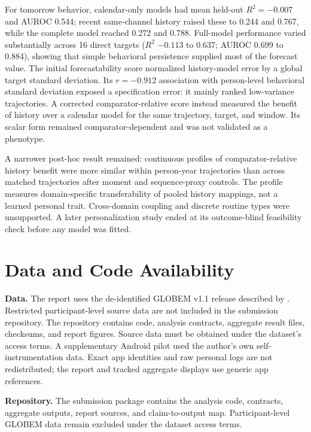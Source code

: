 \documentclass[a4paper,11pt,oneside]{report}
\begin{document}
For tomorrow behavior, calendar-only models had mean held-out $R^2=-0.007$ and
AUROC 0.544; recent same-channel history raised these to 0.244 and 0.767, while the
complete model reached 0.272 and 0.788. Full-model performance varied substantially
across 16 direct targets ($R^2$ $-0.113$ to 0.637; AUROC 0.699 to 0.884), showing
that simple behavioral persistence supplied most of the forecast value. The
initial forecastability score normalized history-model error by a global target
standard deviation. Its $r=-0.912$ association with person-level behavioral
standard deviation exposed a specification error: it mainly ranked low-variance
trajectories. A corrected comparator-relative score instead measured the benefit of
history over a calendar model for the same trajectory, target, and window. Its
scalar form remained comparator-dependent and was not validated as a phenotype.

A narrower post-hoc result remained: continuous profiles of comparator-relative
history benefit were more similar within person-year trajectories than across
matched trajectories after moment and sequence-proxy controls. The profile measures
domain-specific transferability of pooled history mappings, not a learned personal
trait. Cross-domain coupling and discrete routine types were unsupported. A later
personalization study ended at its outcome-blind feasibility check before any model
was fitted.

\chapter*{Data and Code Availability}

\textbf{Data.} The report uses the de-identified GLOBEM v1.1 release described by
\citet{xu2022globem}. Restricted participant-level source data are not included in
the submission repository. The repository contains code, analysis contracts,
aggregate result files, checksums, and report figures. Source data must be obtained
under the dataset's access terms. A supplementary Android pilot used the author's
own self-instrumentation data. Exact app identities and raw personal logs are not
redistributed; the report and tracked aggregate displays use generic app references.

\textbf{Repository.} The submission package contains the analysis code, contracts,
aggregate outputs, report sources, and claim-to-output map. Participant-level GLOBEM
data remain excluded under the dataset access terms.
\end{document}
